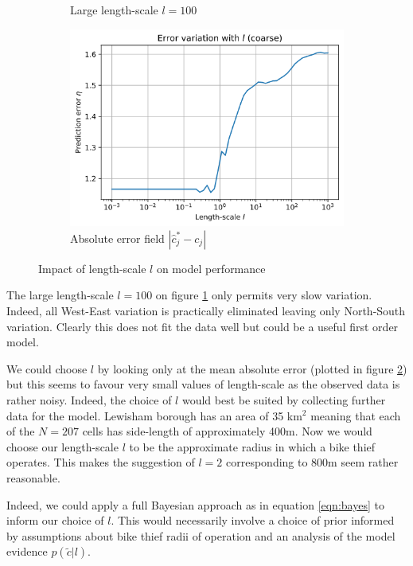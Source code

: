 \documentclass[]{article}
\begin{document}
\begin{figure}[!h]
\begin{subfigure}{0.32\linewidth}
		\caption{Large length-scale $l=100$}
		\label{fig:l-big}
	\end{subfigure}
	\begin{subfigure}{0.32\linewidth}
		\includegraphics[width=\linewidth]{error-with-l.png}
		\caption{Absolute error field $|\hat{c}^*_j - c_j|$}
		\label{fig:error-with-l}
	\end{subfigure}
	\caption{Impact of length-scale $l$ on model performance}
	\label{fig:l-effect-bikes}
\end{figure}

The large length-scale $l=100$ on figure \ref{fig:l-big} only permits very slow variation. Indeed, all West-East variation is practically eliminated leaving only North-South variation. Clearly this does not fit the data well but could be a useful first order model.

We could choose $l$ by looking only at the mean absolute error (plotted in figure \ref{fig:error-with-l}) but this seems to favour very small values of length-scale as the observed data is rather noisy. Indeed, the choice of $l$ would best be suited by collecting further data for the model. Lewisham borough has an area of 35 km$^2$ meaning that each of the $N=207$ cells has side-length of approximately 400m. Now we would choose our length-scale $l$ to be the approximate radius in which a bike thief operates. This makes the suggestion of $l=2$ corresponding to 800m seem rather reasonable.

Indeed, we could apply a full Bayesian approach as in equation \ref{eqn:bayes} to inform our choice of $l$. This would necessarily involve a choice of prior informed by assumptions about bike thief radii of operation and an analysis of the model evidence $p(\tilde{c} | l)$.
\end{document}
